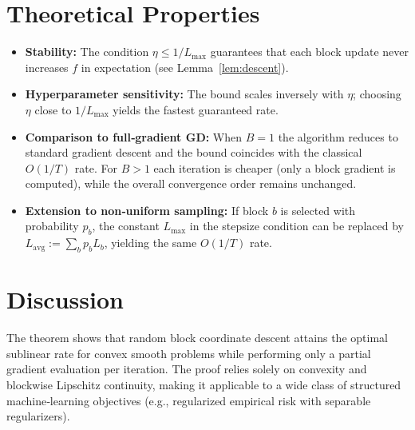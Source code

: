 \documentclass[11pt]{article}
\begin{document}
\section*{Theoretical Properties}
\begin{itemize}
\item \textbf{Stability:} The condition $\eta\le1/L_{\max}$ guarantees that each
block update never increases $f$ in expectation (see Lemma~\ref{lem:descent}).
\item \textbf{Hyperparameter sensitivity:} The bound scales inversely with $\eta$;
choosing $\eta$ close to $1/L_{\max}$ yields the fastest guaranteed rate.
\item \textbf{Comparison to full‑gradient GD:} When $B=1$ the algorithm reduces to
standard gradient descent and the bound coincides with the classical $O(1/T)$
rate. For $B>1$ each iteration is cheaper (only a block gradient is computed),
while the overall convergence order remains unchanged.
\item \textbf{Extension to non‑uniform sampling:} If block $b$ is selected with
probability $p_b$, the constant $L_{\max}$ in the stepsize condition can be
replaced by $L_{\text{avg}}:=\sum_{b}p_b L_b$, yielding the same $O(1/T)$ rate.
\end{itemize}

\section*{Discussion}
The theorem shows that random block coordinate descent attains the optimal
sublinear rate for convex smooth problems while performing only a partial
gradient evaluation per iteration. The proof relies solely on convexity and
blockwise Lipschitz continuity, making it applicable to a wide class of
structured machine‑learning objectives (e.g., regularized empirical risk with
separable regularizers).

\end{document}
